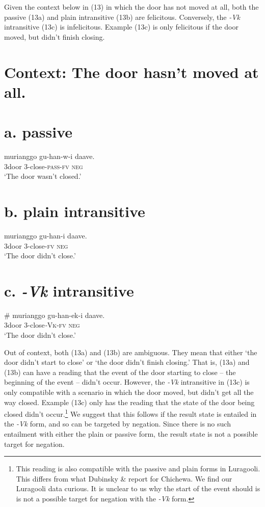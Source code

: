 \documentclass[output=paper]{langsci/langscibook}
\begin{document}
\begin{styleTabellenberschrift}
Given the context below in (13) in which the door has not moved at all, both the passive (13a) and plain intransitive (13b) are felicitous. Conversely, the \textit{{}-Vk} intransitive (13c) is infelicitous. Example (13c) is only felicitous if the door moved, but didn’t finish closing.

\chapter{Context: The door hasn’t moved at all.}
\chapter[a. passive]{a. \textbf{passive}}
\gll   murianggo gu-han-w-i           daave.\\
       3door        3-close-\textsc{pass}{}-\textsc{fv}    \textsc{neg}\\
\glt ‘The door wasn’t closed.’
\z

\chapter[b. plain intransitive]{b. \textbf{plain intransitive}}
\gll \textbf{  }murianggo gu-han-i     daave.\\
     \textit{  }3door         3-close-\textsc{fv}  \textsc{neg}\\
\glt ‘The door didn’t close.’
\z

\chapter[c. {}-Vk intransitive]{c. \textbf{\textit{{}-Vk}}\textbf{ intransitive}}
\gll \textbf{  }\# murianggo gu-han-ek-i      daave.\\
     \textit{     }3door         3-close\textit{{}-}\textsc{Vk}{}-\textsc{fv}   \textsc{neg}\\
\glt ‘The door didn’t close.’
\z

Out of context, both (13a) and (13b) are ambiguous. They mean that either ‘the door didn’t start to close’ or ‘the door didn’t finish closing.’ That is, (13a) and (13b) can have a reading that the event of the door starting to close – the beginning of the event – didn’t occur. However, the \textit{{}-Vk }intransitive in (13c) is only compatible with a scenario in which the door moved, but didn’t get all the way closed. Example (13c) only has the reading that the state of the door being closed didn’t occur.\footnote{ This reading is also compatible with the passive and plain forms in Luragooli. This differs from what Dubinsky \& \citet{Simango1996} report for Chichewa. We find our Luragooli data curious. It is unclear to us why the start of the event should is is not  a possible target for negation with the \textit{{}-Vk} form. } We suggest that this follows if the result state is entailed in the \textit{{}-Vk} form, and so can be targeted by negation. Since there is no such entailment with either the plain or passive form, the result state is not a possible target for negation.


\end{styleTabellenberschrift}
\end{document}
